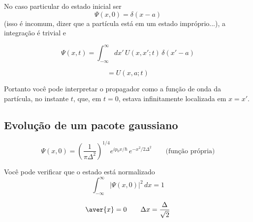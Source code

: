 No caso particular do estado inicial ser
\begin{equation}
    \Psi(x,0) = \delta(x-a)
\label{eq:aula14_psi0_delta}
\end{equation}
(isso é incomum, dizer que a partícula está em um estado impróprio...), a integração é trivial e

\begin{equation}
    \Psi(x,t) = \int_{-\infty}^{\infty} dx'\, U(x,x';t)\, \delta(x'-a)
\label{eq:aula14_psi_xt_delta}
\end{equation}

\begin{equation}
    = U(x,a;t)
\label{eq:aula14_psi_xt_delta_resultado}
\end{equation}

Portanto você pode interpretar o propagador como a função de onda da partícula, no instante $t$, que, em $t=0$, estava infinitamente localizada em $x = x'$.

\subsection*{Evolução de um pacote gaussiano}

\begin{equation}
    \Psi(x,0) = \left(\frac{1}{\pi\Delta^2}\right)^{1/4} e^{i p_0 x/\hbar}\, e^{-x^2/2\Delta^2} \qquad \text{(função própria)}
\label{eq:aula14_pacote_gaussiano_inicial}
\end{equation}

Você pode verificar que o estado está normalizado
\begin{equation}
    \int_{-\infty}^{\infty} |\Psi(x,0)|^2\, dx = 1
\label{eq:aula14_normalizacao_pacote}
\end{equation}

\begin{center}
\end{center}

\begin{equation}
    \aver{x} = 0 \qquad \Delta x = \frac{\Delta}{\sqrt{2}}
\label{eq:aula14_valores_esperados_x0}
\end{equation}

